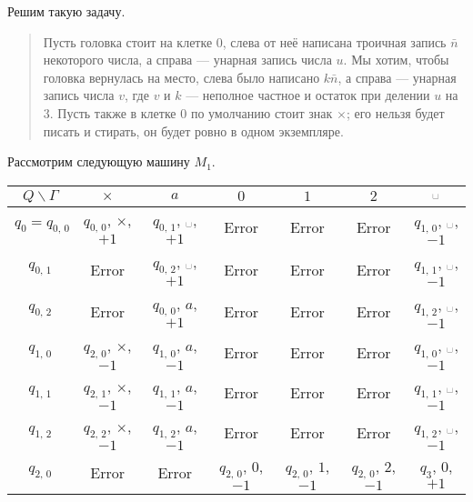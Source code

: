 \documentclass[12pt,a4paper]{article}
\newcommand{\spacesymbol}{\ensuremath{\text{\textvisiblespace}}}
\begin{document}
    \begin{enumproblem}
        Решим такую задачу.
        \begin{quotation}
            Пусть головка стоит на клетке $0$, слева от неё написана троичная запись $\bar{n}$ некоторого числа, а справа --- унарная запись числа $u$. Мы хотим, чтобы головка вернулась на место, слева было написано $k\bar{n}$, а справа --- унарная запись числа $v$, где $v$ и $k$ --- неполное частное и остаток при делении $u$ на $3$. Пусть также в клетке $0$ по умолчанию стоит знак $\times$; его нельзя будет писать и стирать, он будет ровно в одном экземпляре.
        \end{quotation}
        Рассмотрим следующую машину $M_1$.
        \begin{table}[H]
            \centering
            \begin{tabular}{c||c|c|c|c|c|c}
                $Q\backslash\Gamma$& $\times$& $a$& $0$& $1$& $2$& \spacesymbol\\
                \hline
                \hline
                $q_0 = q_{\text{0, 0}}$& $q_{\text{0, 0}}$, $\times$, $+1$& $q_{\text{0, 1}}$, \spacesymbol, $+1$& Error& Error& Error& $q_{\text{1, 0}}$, \spacesymbol, $-1$\\
                \hline
                $q_{\text{0, 1}}$& Error& $q_{\text{0, 2}}$, \spacesymbol, $+1$& Error& Error& Error& $q_{\text{1, 1}}$, \spacesymbol, $-1$\\
                \hline
                $q_{\text{0, 2}}$& Error& $q_{\text{0, 0}}$, $a$, $+1$& Error& Error& Error& $q_{\text{1, 2}}$, \spacesymbol, $-1$\\
                \hline
                $q_{\text{1, 0}}$& $q_{\text{2, 0}}$, $\times$, $-1$& $q_{\text{1, 0}}$, $a$, $-1$& Error& Error& Error& $q_{\text{1, 0}}$, \spacesymbol, $-1$\\
                \hline
                $q_{\text{1, 1}}$& $q_{\text{2, 1}}$, $\times$, $-1$& $q_{\text{1, 1}}$, $a$, $-1$& Error& Error& Error& $q_{\text{1, 1}}$, \spacesymbol, $-1$\\
                \hline
                $q_{\text{1, 2}}$& $q_{\text{2, 2}}$, $\times$, $-1$& $q_{\text{1, 2}}$, $a$, $-1$& Error& Error& Error& $q_{\text{1, 2}}$, \spacesymbol, $-1$\\
                \hline
                $q_{\text{2, 0}}$& Error& Error& $q_{\text{2, 0}}$, $0$, $-1$& $q_{\text{2, 0}}$, $1$, $-1$& $q_{\text{2, 0}}$, $2$, $-1$& $q_3$, $0$, $+1$\\
                \hline

\end{tabular}
\end{table}
\end{enumproblem}
\end{document}
